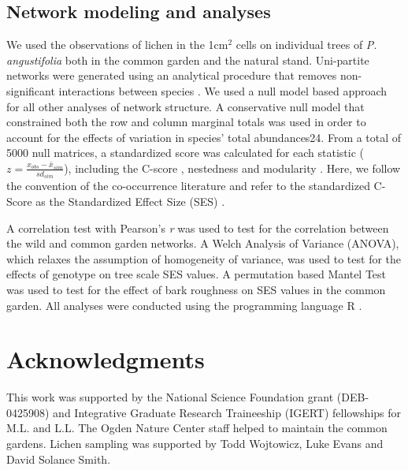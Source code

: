 \documentclass[fleqn,10pt]{wlscirep}
\begin{document}
\subsection*{Network modeling and analyses}

We used the observations of lichen in the 1cm$^2$ cells on individual
trees of \textit{P. angustifolia} both in the common garden and the
natural stand. Uni-partite networks were generated using an analytical
procedure that removes non-significant interactions between species
\cite{Araujo2011}. We used a null model based approach for all other
analyses of network structure. A conservative null model that
constrained both the row and column marginal totals was used in order
to account for the effects of variation in species’ total
abundances24. From a total of 5000 null matrices, a standardized score
was calculated for each statistic ($z = \frac{x_{obs} -
  \bar{x}_{sim}}{sd_{sim}}$), including the C-score \cite{Stone1990a},
nestedness \cite{Atmar1993} and modularity \cite{Newman2006}. Here, we
follow the convention of the co-occurrence literature and refer to the
standardized C-Score as the Standardized Effect Size (SES)
\cite{Gotelli2001}.

A correlation test with Pearson’s \textit{r} was used to test for the
correlation between the wild and common garden networks. A Welch
Analysis of Variance (ANOVA), which relaxes the assumption of
homogeneity of variance, was used to test for the effects of genotype
on tree scale SES values. A permutation based Mantel Test was used to
test for the effect of bark roughness on SES values in the common
garden. All analyses were conducted using the programming language R
\cite{RCoreTeam2017}.






\section*{Acknowledgments} 

This work was supported by the National Science Foundation grant
(DEB-0425908) and Integrative Graduate Research Traineeship (IGERT)
fellowships for M.L. and L.L. The Ogden Nature Center staff helped to
maintain the common gardens. Lichen sampling was supported by Todd
Wojtowicz, Luke Evans and David Solance Smith.
\end{document}
